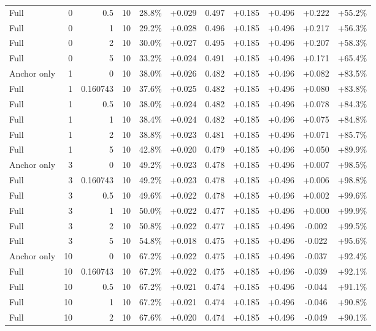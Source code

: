 \begin{table}[htbp]
\begin{tabular}{lrrrccccccc}
Full & 0 & 0.5 & 10 & 28.8\% & +0.029 & 0.497 & +0.185 & +0.496 & +0.222 & +55.2\% \\
Full & 0 & 1 & 10 & 29.2\% & +0.028 & 0.496 & +0.185 & +0.496 & +0.217 & +56.3\% \\
Full & 0 & 2 & 10 & 30.0\% & +0.027 & 0.495 & +0.185 & +0.496 & +0.207 & +58.3\% \\
Full & 0 & 5 & 10 & 33.2\% & +0.024 & 0.491 & +0.185 & +0.496 & +0.171 & +65.4\% \\
Anchor only & 1 & 0 & 10 & 38.0\% & +0.026 & 0.482 & +0.185 & +0.496 & +0.082 & +83.5\% \\
Full & 1 & 0.160743 & 10 & 37.6\% & +0.025 & 0.482 & +0.185 & +0.496 & +0.080 & +83.8\% \\
Full & 1 & 0.5 & 10 & 38.0\% & +0.024 & 0.482 & +0.185 & +0.496 & +0.078 & +84.3\% \\
Full & 1 & 1 & 10 & 38.4\% & +0.024 & 0.482 & +0.185 & +0.496 & +0.075 & +84.8\% \\
Full & 1 & 2 & 10 & 38.8\% & +0.023 & 0.481 & +0.185 & +0.496 & +0.071 & +85.7\% \\
Full & 1 & 5 & 10 & 42.8\% & +0.020 & 0.479 & +0.185 & +0.496 & +0.050 & +89.9\% \\
Anchor only & 3 & 0 & 10 & 49.2\% & +0.023 & 0.478 & +0.185 & +0.496 & +0.007 & +98.5\% \\
Full & 3 & 0.160743 & 10 & 49.2\% & +0.023 & 0.478 & +0.185 & +0.496 & +0.006 & +98.8\% \\
Full & 3 & 0.5 & 10 & 49.6\% & +0.022 & 0.478 & +0.185 & +0.496 & +0.002 & +99.6\% \\
Full & 3 & 1 & 10 & 50.0\% & +0.022 & 0.477 & +0.185 & +0.496 & +0.000 & +99.9\% \\
Full & 3 & 2 & 10 & 50.8\% & +0.022 & 0.477 & +0.185 & +0.496 & -0.002 & +99.5\% \\
Full & 3 & 5 & 10 & 54.8\% & +0.018 & 0.475 & +0.185 & +0.496 & -0.022 & +95.6\% \\
Anchor only & 10 & 0 & 10 & 67.2\% & +0.022 & 0.475 & +0.185 & +0.496 & -0.037 & +92.4\% \\
Full & 10 & 0.160743 & 10 & 67.2\% & +0.022 & 0.475 & +0.185 & +0.496 & -0.039 & +92.1\% \\
Full & 10 & 0.5 & 10 & 67.2\% & +0.021 & 0.474 & +0.185 & +0.496 & -0.044 & +91.1\% \\
Full & 10 & 1 & 10 & 67.2\% & +0.021 & 0.474 & +0.185 & +0.496 & -0.046 & +90.8\% \\
Full & 10 & 2 & 10 & 67.6\% & +0.020 & 0.474 & +0.185 & +0.496 & -0.049 & +90.1\% \\

\end{tabular}
\end{table}
